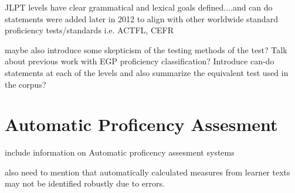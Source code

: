 JLPT levels have clear grammatical and lexical goals defined....and can do statements were added later in 2012 to
align with other worldwide standard proficiency tests/standards i.e. ACTFL, CEFR

maybe also introduce some skepticism of the testing methods of the test?
Talk about previous work with EGP proficiency classification?
Introduce can-do statements at each of the levels and also summarize the equivalent test used in the corpus?


\section{Automatic Proficency Assesment}
include information on Automatic proficency assesment systems

also need to mention that automatically calculated measures from
learner texts may not be
identified robustly due to errors.


